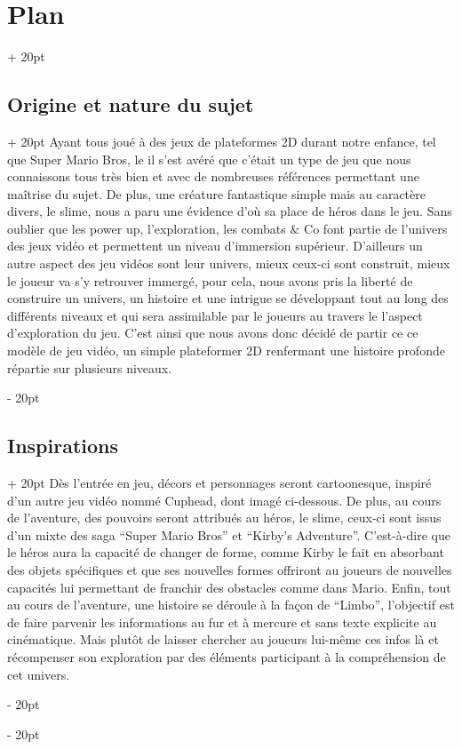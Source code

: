 \documentclass[a4paper, 12pt, twoside]{article}
\newcommand{\ind}[1][20pt]{\advance\leftskip + #1}
\newcommand{\deind}[1][20pt]{\advance\leftskip - #1}
\newenvironment{indt}[2][20pt]{#2 \par \ind[#1]}{\par \deind} %
\begin{document}
    \begin{indt}{\section{Plan}}
        \begin{indt}{\subsection{Origine et nature du sujet}}
            Ayant tous joué à des jeux de plateformes 2D durant notre enfance, tel que Super Mario Bros, le il s'est avéré que c'était un type de jeu que nous connaissons tous très bien et avec de nombreuses références permettant une maîtrise du sujet. De plus, une créature fantastique simple mais au caractère divers, le slime, nous a paru une évidence d'où sa place de héros dans le jeu. Sans oublier que les power up, l'exploration, les combats $\&$ Co font partie de l'univers des jeux vidéo et permettent un niveau d'immersion supérieur. D'ailleurs un autre aspect des jeu vidéos sont leur univers, mieux ceux-ci sont construit, mieux le joueur va s'y retrouver immergé, pour cela, nous avons pris la liberté de construire un univers, un histoire et une intrigue se développant tout au long des différents niveaux et qui sera assimilable par le joueurs au travers le l'aspect d'exploration du jeu. C'est ainsi que nous avons donc décidé de partir ce ce modèle de jeu vidéo, un simple plateformer 2D renfermant une histoire profonde répartie sur plusieurs niveaux.
        \end{indt}

        \begin{indt}{\subsection{Inspirations}}
            Dès l'entrée en jeu, décors et personnages seront cartoonesque, inspiré d'un autre jeu vidéo nommé Cuphead, dont imagé ci-dessous. De plus, au cours de l'aventure, des pouvoirs seront attribués au héros, le slime, ceux-ci sont issus d'un mixte des saga “Super Mario Bros” et “Kirby's Adventure”. C'est-à-dire que le héros aura la capacité de changer de forme, comme Kirby le fait en absorbant des objets spécifiques et que ses nouvelles formes offriront au joueurs de nouvelles capacités lui permettant de franchir des obstacles comme dans Mario. Enfin, tout au cours de l'aventure, une histoire se déroule à la façon de “Limbo”, l'objectif est de faire parvenir les informations au fur et à mercure et sans texte explicite au cinématique. Mais plutôt de laisser chercher au joueurs lui-même ces infos là et récompenser son exploration par des éléments participant à la compréhension de cet univers.
        \end{indt}


\end{indt}
\end{document}
